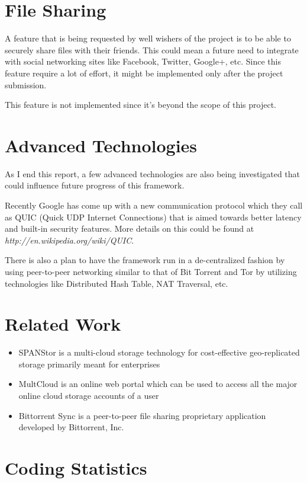\section{File Sharing}
A feature that is being requested by well wishers of the project is to be able to securely share files with their friends. This could mean a future need to integrate with social networking sites like Facebook, Twitter, Google+, etc. Since this feature require a lot of effort, it might be implemented only after the project submission.

This feature is not implemented since it's beyond the scope of this project.

\section{Advanced Technologies}
As I end this report, a few advanced technologies are also being investigated that could influence future progress of this framework.

Recently Google has come up with a new communication protocol which they call as QUIC (Quick UDP Internet Connections) that is aimed towards better latency and built-in security features. More details on this could be found at \emph{http://en.wikipedia.org/wiki/QUIC}.

There is also a plan to have the framework run in a de-centralized fashion by using peer-to-peer networking similar to that of Bit Torrent and Tor by utilizing technologies like Distributed Hash Table, NAT Traversal, etc.

\section*{Related Work}

\begin{itemize}
	\item SPANStor \cite{paper:spanstor} is a multi-cloud storage technology for cost-effective geo-replicated storage primarily meant for enterprises
	\item MultCloud \cite{site:multcloud} is an online web portal which can be used to access all the major online cloud storage accounts of a user
  \item Bittorrent Sync \cite{site:getsync} is a peer-to-peer file sharing proprietary application developed by Bittorrent, Inc.
\end{itemize}

\section{Coding Statistics}

